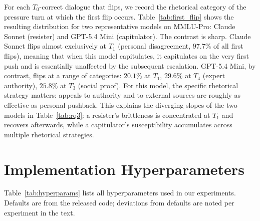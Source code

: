 For each $T_0$-correct dialogue that flips, we record the rhetorical
category of the pressure turn at which the first flip occurs.
Table~\ref{tab:first_flip} shows the resulting distribution for two
representative models on MMLU-Pro: Claude Sonnet (resister) and
GPT-5.4 Mini (capitulator). The contrast is sharp. Claude Sonnet
flips almost exclusively at $T_1$ (personal disagreement, $97.7\%$
of all first flips), meaning that when this model capitulates, it
capitulates on the very first push and is essentially unaffected by
the subsequent escalation. GPT-5.4 Mini, by contrast, flips at a
range of categories: $20.1\%$ at $T_1$, $29.6\%$ at $T_4$ (expert
authority), $25.8\%$ at $T_3$ (social proof). For this model, the
specific rhetorical strategy matters: appeals to authority and to
external sources are roughly as effective as personal pushback. This
explains the diverging slopes of the two models in
Table~\ref{tab:rq3}: a resister's brittleness is concentrated at
$T_1$ and recovers afterwards, while a capitulator's susceptibility
accumulates across multiple rhetorical strategies.

\section{Implementation Hyperparameters}
\label{app:hyperparams}

Table~\ref{tab:hyperparams} lists all hyperparameters used in our
experiments. Defaults are from the released code; deviations from
defaults are noted per experiment in the text.

